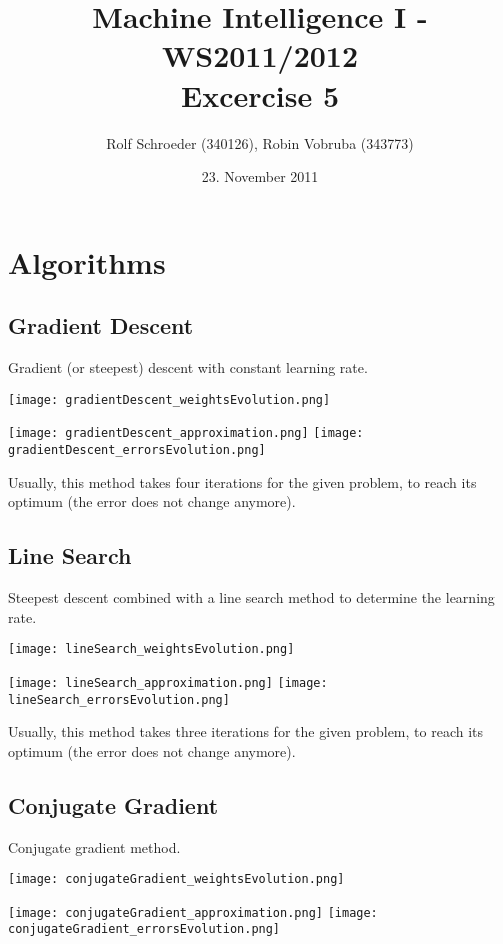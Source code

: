 \documentclass[a4paper,headings=small]{scrartcl}
\title{Machine Intelligence I - WS2011/2012\\Excercise 5}
\author{Rolf Schroeder (340126), Robin Vobruba (343773)}
\date{23. November 2011}
\numberwithin{equation}{section} %
\numberwithin{figure}{section}   %
\begin{document}
\maketitle


\newpage
\section{Algorithms}


\subsection{Gradient Descent}

Gradient (or steepest) descent with constant learning rate.

\texttt{[image: gradientDescent\_weightsEvolution.png]}

\texttt{[image: gradientDescent\_approximation.png]}
\texttt{[image: gradientDescent\_errorsEvolution.png]}

Usually, this method takes four iterations for the given problem,
to reach its optimum (the error does not change anymore).


\newpage
\subsection{Line Search}

Steepest descent combined with a line search method to determine the learning rate.

\texttt{[image: lineSearch\_weightsEvolution.png]}

\texttt{[image: lineSearch\_approximation.png]}
\texttt{[image: lineSearch\_errorsEvolution.png]}

Usually, this method takes three iterations for the given problem,
to reach its optimum (the error does not change anymore).


\newpage
\subsection{Conjugate Gradient}

Conjugate gradient method.

\texttt{[image: conjugateGradient\_weightsEvolution.png]}

\texttt{[image: conjugateGradient\_approximation.png]}
\texttt{[image: conjugateGradient\_errorsEvolution.png]}
\end{document}
